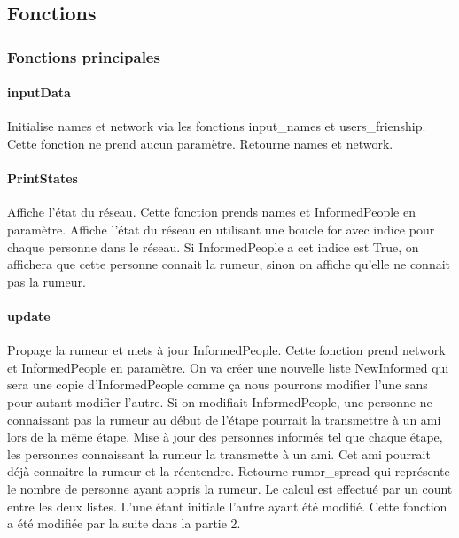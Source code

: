 \documentclass[a4paper,11pt]{article}
\begin{document}
\subsection{Fonctions}
\subsubsection{Fonctions principales}
\paragraph{inputData\newline}
{Initialise names et network via les fonctions input\_names et users\_frienship. Cette fonction ne prend aucun paramètre.
Retourne names et network.}

\paragraph{PrintStates\newline}
{Affiche l'état du réseau. Cette fonction prends names et InformedPeople en paramètre.\newline
Affiche l'état du réseau en utilisant une boucle for avec indice pour chaque personne dans le réseau. Si InformedPeople a cet indice est True, 
on affichera que cette personne connait la rumeur, sinon on affiche qu'elle ne connait pas la rumeur.}

\paragraph{update\newline}
{Propage la rumeur et mets à jour InformedPeople. Cette fonction prend network et InformedPeople en paramètre.
On va créer une nouvelle liste NewInformed qui sera une copie d'InformedPeople comme ça nous pourrons modifier l'une sans pour autant modifier l'autre.
Si on modifiait InformedPeople, une personne ne connaissant pas la rumeur au début de l'étape pourrait la transmettre à un ami lors de la même étape.
Mise à jour des personnes informés tel que chaque étape, les personnes connaissant la rumeur la transmette à un ami.
Cet ami pourrait déjà connaitre la rumeur et la réentendre.
Retourne rumor\_spread qui représente le nombre de personne ayant appris la rumeur. Le calcul est effectué par un count entre les deux listes.
L'une étant initiale l'autre ayant été modifié. Cette fonction a été modifiée par la suite dans la partie 2.}
\end{document}
